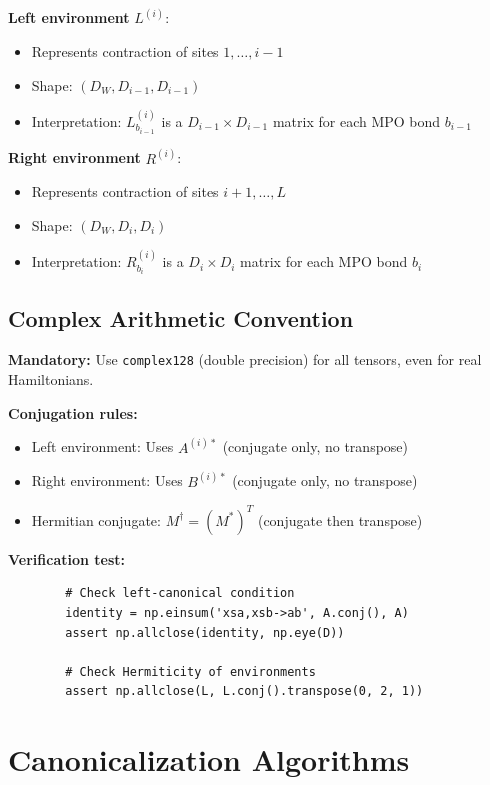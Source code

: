 \documentclass[aps,prb,onecolumn,scriptaddress]{revtex4-2}
\begin{document}
	\textbf{Left environment} $L^{(i)}$:
	\begin{itemize}
		\item Represents contraction of sites $1, \ldots, i-1$
		\item Shape: $(D_W, D_{i-1}, D_{i-1})$
		\item Interpretation: $L^{(i)}_{b_{i-1}}$ is a $D_{i-1} \times D_{i-1}$ matrix for each MPO bond $b_{i-1}$
	\end{itemize}
	
	\textbf{Right environment} $R^{(i)}$:
	\begin{itemize}
		\item Represents contraction of sites $i+1, \ldots, L$
		\item Shape: $(D_W, D_i, D_i)$
		\item Interpretation: $R^{(i)}_{b_i}$ is a $D_i \times D_i$ matrix for each MPO bond $b_i$
	\end{itemize}
	
	\subsection{Complex Arithmetic Convention}
	
	\textbf{Mandatory:} Use \texttt{complex128} (double precision) for all tensors, even for real Hamiltonians.
	
	\textbf{Conjugation rules:}
	\begin{itemize}
		\item Left environment: Uses $A^{(i)*}$ (conjugate only, no transpose)
		\item Right environment: Uses $B^{(i)*}$ (conjugate only, no transpose)
		\item Hermitian conjugate: $M^\dagger = (M^*)^T$ (conjugate then transpose)
	\end{itemize}
	
	\textbf{Verification test:}
	\begin{verbatim}
		# Check left-canonical condition
		identity = np.einsum('xsa,xsb->ab', A.conj(), A)
		assert np.allclose(identity, np.eye(D))
		
		# Check Hermiticity of environments
		assert np.allclose(L, L.conj().transpose(0, 2, 1))
	\end{verbatim}
	
	\section{Canonicalization Algorithms}
	
\end{document}
